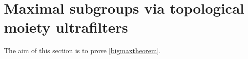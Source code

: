 \documentclass[11pt]{amsart}
\newtheorem{lemma}[theorem]{Lemma}
\theoremstyle{definition}
\newcommand{\Homeo}{\operatorname{Homeo}}
\newcommand{\B}{\mathcal B}
\newcommand{\A}{\mathcal A}
\newcommand{\w}{\omega}
\begin{document}


\section{Maximal subgroups via topological moiety ultrafilters}\label{section:filters}


The aim of this section is to prove \cref{bigmaxtheorem}.
\end{document}
